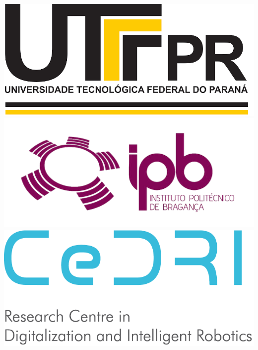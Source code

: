 \documentclass[%
  final,%
  english,%
  english,%
]{beamer}
\begin{document}
\begin{frame}[t, fragile = singleslide]
\begin{columns}[t, onlytextwidth]
\begin{column}{0.1\textwidth}
\begin{flushright}
\includegraphics[width = \columnwidth]{./Logos/logo_utfpr}%
\vspace*{0.5\baselineskip}
\includegraphics[width = \columnwidth]{./Logos/logo_IPB_2}%
\vspace*{0.5\baselineskip}
\includegraphics[width = \columnwidth]{./Logos/cedri}%
\end{flushright}
\end{column}
%
\end{columns}%


\end{frame}
\end{document}
